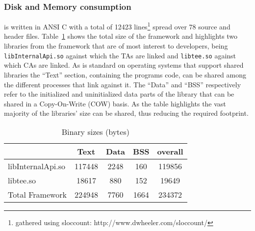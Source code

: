 \documentclass[10pt,conference,letterpaper]{IEEEtran}
\newcommand{\opentee}{\protect{TEE-Vi}\xspace}
\newcommand{\opentee}{\protect{Open-TEE}\xspace}
\begin{document}
\subsubsection{Disk and Memory consumption}
\opentee is written in ANSI C with a total of 12423 lines\footnote{gathered using sloccount: http://www.dwheeler.com/sloccount/} spread over 78 source and header files. Table~\ref{tab:sizes} shows the total size of the framework and highlights two libraries from the framework that are of most interest to developers, being \texttt{ libInternalApi.so} against which the TAs are linked and \texttt{libtee.so} against which CAs are linked. As is standard on operating systems that support shared libraries the ``Text'' section, containing the programs code, can be shared among the different processes that link against it. The ``Data'' and ``BSS'' respectively refer to the initialized and uninitialized data parts of the library that can be shared in a Copy-On-Write (COW) basis. As the table highlights the vast majority of the libraries' size can be shared, thus reducing the required footprint.

\begin{table}
\centering
\caption{Binary sizes (bytes)}
\label{tab:sizes}
\begin{tabular}{l c c c c}
  & Text & Data & BSS & overall \\
  \hline
  libInternalApi.so & 117448 & 2248 & 160 & 119856 \\
  \rowcolor{black!15} \cellcolor{black!15}libtee.so & 18617 & 880 & 152 & 19649 \\
  Total Framework & 224948 & 7760 & 1664 & 234372 \\
\hline
\end{tabular}
\end{table}
\end{document}

